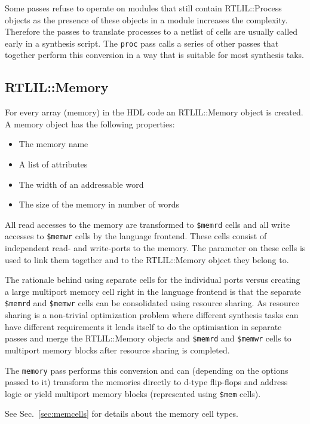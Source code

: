 Some passes refuse to operate on modules that still contain RTLIL::Process objects as the
presence of these objects in a module increases the complexity. Therefore the passes to translate
processes to a netlist of cells are usually called early in a synthesis script. The {\tt proc}
pass calls a series of other passes that together perform this conversion in a way that is suitable
for most synthesis taks.

\subsection{RTLIL::Memory}

For every array (memory) in the HDL code an RTLIL::Memory object is created. A
memory object has the following properties:

\begin{itemize}
\item The memory name
\item A list of attributes
\item The width of an addressable word
\item The size of the memory in number of words
\end{itemize}

All read accesses to the memory are transformed to {\tt \$memrd} cells and all write accesses to
{\tt \$memwr} cells by the language frontend. These cells consist of independent read- and write-ports
to the memory. The  parameter on these cells is used to link them together and to the
RTLIL::Memory object they belong to.

The rationale behind using separate cells for the individual ports versus
creating a large multiport memory cell right in the language frontend is that
the separate {\tt \$memrd} and {\tt \$memwr} cells can be consolidated using resource sharing.
As resource sharing is a non-trivial optimization problem where different synthesis tasks
can have different requirements it lends itself to do the optimisation in separate passes and merge
the RTLIL::Memory objects and {\tt \$memrd} and {\tt \$memwr} cells to multiport memory blocks after resource sharing is completed.

The {\tt memory} pass performs this conversion and can (depending on the options passed
to it) transform the memories directly to d-type flip-flops and address logic or yield
multiport memory blocks (represented using {\tt \$mem} cells).

See Sec.~\ref{sec:memcells} for details about the memory cell types.

